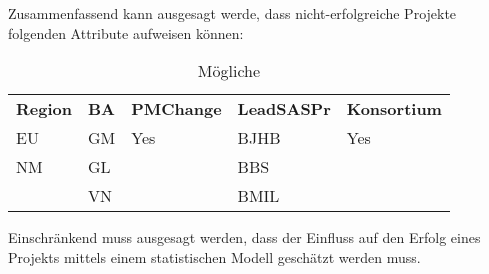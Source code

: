 Zusammenfassend kann ausgesagt werde, dass nicht-erfolgreiche Projekte folgenden Attribute aufweisen können:
\begin{table}[H]
	\centering
	\caption{Mögliche}
	\begin{tabular}{rlrlr}
		\multicolumn{1}{l}{\textbf{Region}} & \textbf{BA} & \multicolumn{1}{l}{\textbf{PMChange}} & \textbf{LeadSASPr} & \multicolumn{1}{l}{\textbf{Konsortium}} \\
		\multicolumn{1}{l}{EU} & GM    & \multicolumn{1}{l}{Yes} & BJHB  & \multicolumn{1}{l}{Yes} \\
		\multicolumn{1}{l}{NM} & GL    &       & BBS   &  \\
		& VN    &       & BMIL  &  \\
	\end{tabular}%

	\label{tab:addlabel}%
\end{table}%
Einschränkend muss ausgesagt werden, dass der Einfluss auf den Erfolg eines Projekts mittels einem statistischen Modell geschätzt werden muss.  
\newpage